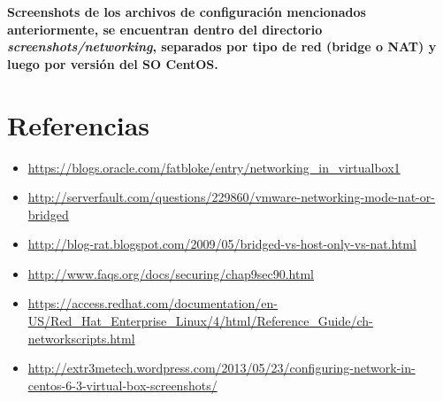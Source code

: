 \documentclass[11pt]{article}
\begin{document}
\textbf{Screenshots de los archivos de configuración mencionados anteriormente, se encuentran dentro del directorio \textit{screenshots/networking}, separados por tipo de red (bridge o NAT) y luego por versión del SO CentOS.}


\section{Referencias}
	\begin{itemize}
		\item \url{https://blogs.oracle.com/fatbloke/entry/networking_in_virtualbox1}
		\item \url{http://serverfault.com/questions/229860/vmware-networking-mode-nat-or-bridged}
		\item \url{http://blog-rat.blogspot.com/2009/05/bridged-vs-host-only-vs-nat.html}
		\item \url{http://www.faqs.org/docs/securing/chap9sec90.html}
		\item \scriptsize \url{https://access.redhat.com/documentation/en-US/Red_Hat_Enterprise_Linux/4/html/Reference_Guide/ch-networkscripts.html}
		\item \scriptsize \url{http://extr3metech.wordpress.com/2013/05/23/configuring-network-in-centos-6-3-virtual-box-screenshots/}
	\end{itemize}
\end{document}
